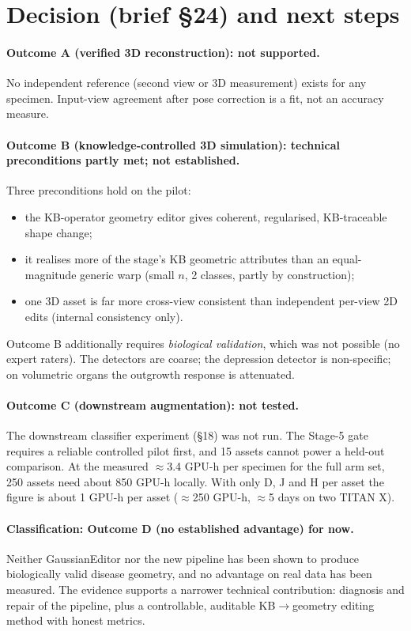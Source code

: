 \section{Decision (brief \S24) and next steps}
\paragraph{Outcome A (verified 3D reconstruction): not supported.} No independent reference (second view or 3D measurement) exists for any specimen. Input-view agreement after pose correction is a fit, not an accuracy measure.
\paragraph{Outcome B (knowledge-controlled 3D simulation): technical preconditions partly met; not established.} Three preconditions hold on the pilot:
\begin{itemize}
\item the KB-operator geometry editor gives coherent, regularised, KB-traceable shape change;
\item it realises more of the stage's KB geometric attributes than an equal-magnitude generic warp (small $n$, 2 classes, partly by construction);
\item one 3D asset is far more cross-view consistent than independent per-view 2D edits (internal consistency only).
\end{itemize}
Outcome B additionally requires \emph{biological validation}, which was not possible (no expert raters). The detectors are coarse; the depression detector is non-specific; on volumetric organs the outgrowth response is attenuated.
\paragraph{Outcome C (downstream augmentation): not tested.} The downstream classifier experiment (\S18) was not run. The Stage-5 gate requires a reliable controlled pilot first, and 15 assets cannot power a held-out comparison. At the measured $\approx$3.4 GPU-h per specimen for the full arm set, 250 assets need about 850 GPU-h locally. With only D, J and H per asset the figure is about 1 GPU-h per asset ($\approx$250 GPU-h, $\approx$5 days on two TITAN X).
\paragraph{Classification: Outcome D (no established advantage) for now.} Neither GaussianEditor nor the new pipeline has been shown to produce biologically valid disease geometry, and no advantage on real data has been measured. The evidence supports a narrower technical contribution: diagnosis and repair of the pipeline, plus a controllable, auditable KB$\to$geometry editing method with honest metrics.
